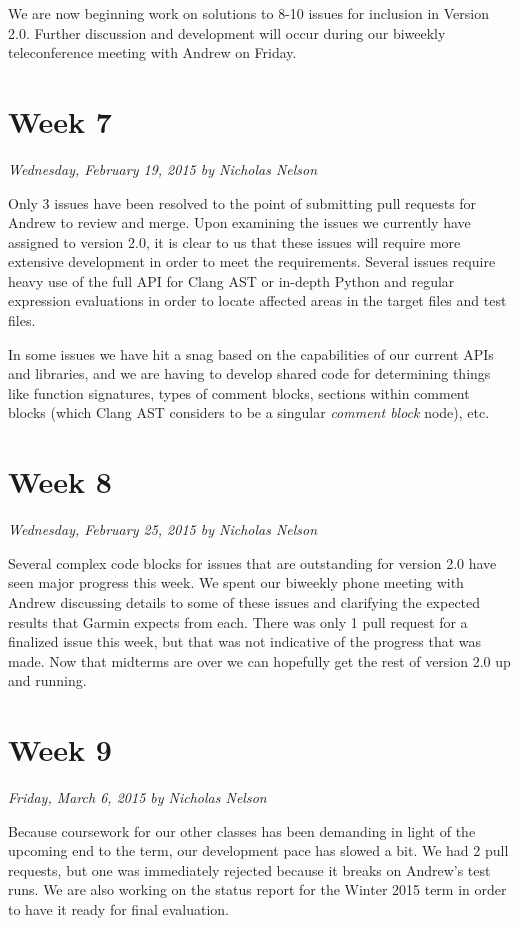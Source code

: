 \documentclass[11pt]{scrreprt}
\begin{document}
We are now beginning work on solutions to 8-10 issues for inclusion in Version 2.0. Further discussion and development will occur during our biweekly teleconference meeting with Andrew on Friday.

\section{Week 7}
\textit{Wednesday, February 19, 2015 by Nicholas Nelson}
\newline

Only 3 issues have been resolved to the point of submitting pull requests for Andrew to review and merge. Upon examining the issues we currently have assigned to version 2.0, it is clear to us that these issues will require more extensive development in order to meet the requirements. Several issues require heavy use of the full API for Clang AST or in-depth Python and regular expression evaluations in order to locate affected areas in the target files and test files.

In some issues we have hit a snag based on the capabilities of our current APIs and libraries, and we are having to develop shared code for determining things like function signatures, types of comment blocks, sections within comment blocks (which Clang AST considers to be a singular \textit{comment block} node), etc.

\section{Week 8}
\textit{Wednesday, February 25, 2015 by Nicholas Nelson}
\newline

Several complex code blocks for issues that are outstanding for version 2.0 have seen major progress this week. We spent our biweekly phone meeting with Andrew discussing details to some of these issues and clarifying the expected results that Garmin expects from each. There was only 1 pull request for a finalized issue this week, but that was not indicative of the progress that was made. Now that midterms are over we can hopefully get the rest of version 2.0 up and running.

\section{Week 9}
\textit{Friday, March 6, 2015 by Nicholas Nelson}
\newline

Because coursework for our other classes has been demanding in light of the upcoming end to the term, our development pace has slowed a bit. We had 2 pull requests, but one was immediately rejected because it breaks on Andrew's test runs. We are also working on the status report for the Winter 2015 term in order to have it ready for final evaluation.
\end{document}
